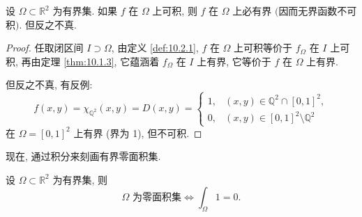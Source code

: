 \begin{theorem}\label{thm:10.2.2}
设 $\Omega \subset \mathbb{R}^2$ 为有界集. 如果 $f$ 在 $\Omega$ 上可积, 则 $f$ 在 $\Omega$ 上必有界 $($因而无界函数不可积$)$. 但反之不真.
\end{theorem}

\begin{proof}
任取闭区间 $I \supset \Omega$, 由定义 \ref{def:10.2.1}, $f$ 在 $\Omega$ 上可积等价于 $f_{\Omega}$ 在 $I$ 上可积, 再由定理 \ref{thm:10.1.3}, 它蕴涵着 $f_{\Omega}$ 在 $I$ 上有界, 它等价于 $f$ 在 $\Omega$ 上有界.

但反之不真, 有反例:
\[
f(x,y) = \chi_{\mathbb{Q}^2}(x,y) = D(x,y) = \begin{cases}
1, & (x,y)\in\mathbb{Q}^2\cap[0,1]^2, \\
0, & (x,y)\in[0,1]^2\setminus\mathbb{Q}^2
\end{cases}
\]
在 $\Omega = [0, 1]^2$ 上有界 (界为 1), 但不可积.
\end{proof}

现在, 通过积分来刻画有界零面积集.

\begin{theorem}[零面积集的积分特征]\label{thm:10.2.3}
设 $\Omega \subset \mathbb{R}^2$ 为有界集, 则
\[
\Omega \text{ 为零面积集} \iff \int_{\Omega}1=0.
\]
\end{theorem}

